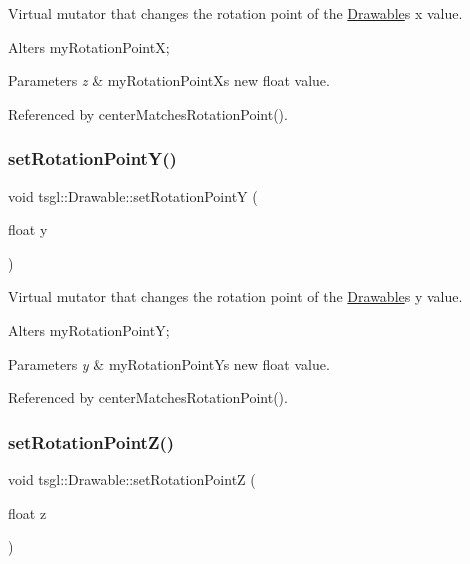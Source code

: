 Virtual mutator that changes the rotation point of the \hyperlink{classtsgl_1_1_drawable}{Drawable}\textquotesingle{}s x value. 

Alters my\+Rotation\+PointX; 
\begin{DoxyParams}{Parameters}
{\em z} & my\+Rotation\+PointX\textquotesingle{}s new float value. \\
\hline
\end{DoxyParams}


Referenced by center\+Matches\+Rotation\+Point().

\mbox{\label{classtsgl_1_1_drawable_a9576c059c277e1e936b5de228c0d59cf}} 
\subsubsection{\texorpdfstring{set\+Rotation\+Point\+Y()}{setRotationPointY()}}
{\footnotesize\ttfamily void tsgl\+::\+Drawable\+::set\+Rotation\+PointY (\begin{DoxyParamCaption}\item[{float}]{y }\end{DoxyParamCaption})\hspace{0.3cm}{\ttfamily [virtual]}}



Virtual mutator that changes the rotation point of the \hyperlink{classtsgl_1_1_drawable}{Drawable}\textquotesingle{}s y value. 

Alters my\+Rotation\+PointY; 
\begin{DoxyParams}{Parameters}
{\em y} & my\+Rotation\+PointY\textquotesingle{}s new float value. \\
\hline
\end{DoxyParams}


Referenced by center\+Matches\+Rotation\+Point().

\mbox{\label{classtsgl_1_1_drawable_a5293782ce59f1aff49defa38945ec6bb}} 
\subsubsection{\texorpdfstring{set\+Rotation\+Point\+Z()}{setRotationPointZ()}}
{\footnotesize\ttfamily void tsgl\+::\+Drawable\+::set\+Rotation\+PointZ (\begin{DoxyParamCaption}\item[{float}]{z }\end{DoxyParamCaption})\hspace{0.3cm}{\ttfamily [virtual]}}



